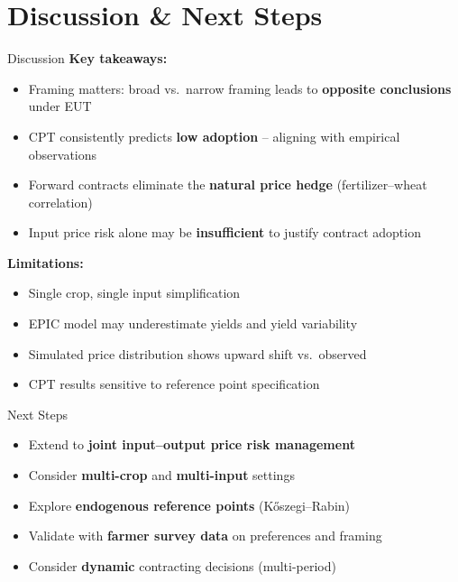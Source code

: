\documentclass[aspectratio=169,12pt]{beamer}
\begin{document}
\section{Discussion \& Next Steps}

\begin{frame}{Discussion}
\textbf{Key takeaways:}
\begin{itemize}
    \item Framing matters: broad vs.\ narrow framing leads to \textbf{opposite conclusions} under EUT
    \item CPT consistently predicts \textbf{low adoption} -- aligning with empirical observations
    \item Forward contracts eliminate the \textbf{natural price hedge} (fertilizer--wheat correlation)
    \item Input price risk alone may be \textbf{insufficient} to justify contract adoption
\end{itemize}

\vspace{0.5em}
\textbf{Limitations:}
\begin{itemize}
    \item Single crop, single input simplification
    \item EPIC model may underestimate yields and yield variability
    \item Simulated price distribution shows upward shift vs.\ observed
    \item CPT results sensitive to reference point specification
\end{itemize}
\end{frame}

\begin{frame}{Next Steps}
\begin{itemize}
    \item Extend to \textbf{joint input--output price risk management}
    \item Consider \textbf{multi-crop} and \textbf{multi-input} settings
    \item Explore \textbf{endogenous reference points} (K\H{o}szegi--Rabin)
    \item Validate with \textbf{farmer survey data} on preferences and framing
    \item Consider \textbf{dynamic} contracting decisions (multi-period)
\end{itemize}
\end{frame}
\end{document}
